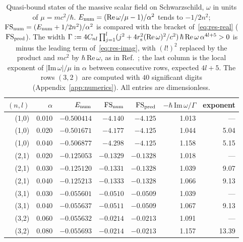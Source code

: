 \documentclass[%
 aip,
 jmp,
 amsmath,amssymb,
 reprint, onecolumn
]{revtex4-1}
\theoremstyle{definition}
\theoremstyle{remark}
\begin{document}
\begin{table}[htb]
\caption{Quasi-bound states of the massive scalar field on
Schwarzschild, $\omega$ in units of $\mu=mc^2/\hbar$.
$E_{\rm num}=(\mathrm{Re}\,\omega/\mu-1)/\alpha^2$ tends to $-1/2n^2$;
$\mathrm{FS}_{\rm num}=(E_{\rm num}+1/2n^2)/\alpha^2$ is compared with the
bracket of~\eqref{eq:res-real} ($\mathrm{FS}_{\rm pred}$). The width
$\Gamma:=4C_{nl}\prod_{j=1}^{l}(j^2+4r_{\rm s}^2(\mathrm{Re}\,\omega)^2
/c^2)\,\hbar\,\mathrm{Re}\,\omega\,\alpha^{4l+5}>0$ is minus the leading
term of~\eqref{eq:res-imag}, with $(l!)^2$ replaced by the product and $mc^2$
by $\hbar\,\mathrm{Re}\,\omega$, as in
Ref.~; the last column is the
local exponent of $|\mathrm{Im}\,\omega|/\mu$ in $\alpha$ between
consecutive rows, expected $4l+5$. The rows $(3,2)$ are computed with
$40$ significant digits (Appendix~\ref{app:numerics}). All entries are
dimensionless.}
\label{tab:atoms}
\begin{ruledtabular}
\begin{tabular}{rrrrrrr}
$(n,l)$ & $\alpha$ & $E_{\rm num}$ & $\mathrm{FS}_{\rm num}$ &
$\mathrm{FS}_{\rm pred}$ & $-\hbar\,\mathrm{Im}\,\omega/\Gamma$ & exponent\\
\hline
(1,0) & 0.010 & $-0.500414$ & $-4.140$ & $-4.125$ & 1.013 & ---\\
(1,0) & 0.020 & $-0.501671$ & $-4.177$ & $-4.125$ & 1.044 & 5.04\\
(1,0) & 0.040 & $-0.506877$ & $-4.298$ & $-4.125$ & 1.158 & 5.15\\
(2,1) & 0.020 & $-0.125053$ & $-0.1329$ & $-0.1328$ & 1.018 & ---\\
(2,1) & 0.030 & $-0.125120$ & $-0.1331$ & $-0.1328$ & 1.039 & 9.07\\
(2,1) & 0.040 & $-0.125213$ & $-0.1333$ & $-0.1328$ & 1.066 & 9.13\\
(3,1) & 0.030 & $-0.055601$ & $-0.0510$ & $-0.0509$ & 1.039 & ---\\
(3,1) & 0.040 & $-0.055637$ & $-0.0511$ & $-0.0509$ & 1.067 & 9.13\\
(3,2) & 0.060 & $-0.055632$ & $-0.0214$ & $-0.0213$ & 1.091 & ---\\
(3,2) & 0.080 & $-0.055693$ & $-0.0214$ & $-0.0213$ & 1.157 & 13.39\\
\end{tabular}
\end{ruledtabular}
\end{table}
\end{document}
